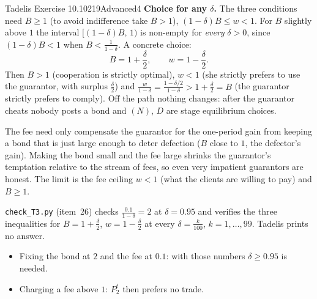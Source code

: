 \begin{exsol}{Tadelis Exercise 10.10}{219}{Advanced}{4}
\textbf{Choice for any $\delta$.} The three conditions need $B \ge 1$ (to avoid indifference take $B > 1$),
$(1-\delta)B \le w < 1$. For $B$ slightly above $1$ the interval $\bigl[(1-\delta)B,\,1\bigr)$ is non-empty for
\emph{every} $\delta > 0$, since $(1-\delta)B < 1$ when $B < \frac1{1-\delta}$. A concrete choice:
\[
  B = 1 + \frac\delta2, \qquad w = 1 - \frac\delta2 .
\]
Then $B > 1$ (cooperation is strictly optimal), $w < 1$ (she strictly prefers to use the guarantor, with surplus
$\frac\delta2$) and $\frac{w}{1-\delta} = \frac{1 - \delta/2}{1-\delta} > 1 + \frac\delta2 = B$ (the guarantor
strictly prefers to comply). Off the path nothing changes: after the guarantor cheats nobody posts a bond and
$(N)$, $D$ are stage equilibrium choices.

\interp The fee need only compensate the guarantor for the one-period gain from keeping a bond that is just
large enough to deter defection ($B$ close to $1$, the defector's gain). Making the bond small and the fee large
shrinks the guarantor's temptation relative to the stream of fees, so even very impatient guarantors are
honest. The limit is the fee ceiling $w < 1$ (what the clients are willing to pay) and $B \ge 1$.

\verify \texttt{check\_T3.py} (item~26) checks $\frac{0.1}{1-\delta} = 2$ at $\delta = 0.95$ and verifies the three
inequalities for $B = 1 + \frac\delta2$, $w = 1 - \frac\delta2$ at every $\delta = \frac{k}{100}$,
$k = 1,\dots,99$. Tadelis prints no answer.

\mistakes
\begin{itemize}
  \item Fixing the bond at $2$ and the fee at $0.1$: with those numbers $\delta \ge 0.95$ is needed.
  \item Charging a fee above $1$: $P_2^t$ then prefers no trade.
\end{itemize}

\end{exsol}
